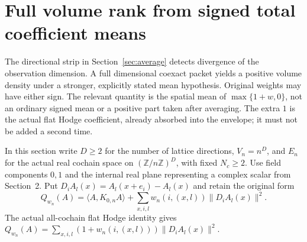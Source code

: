 \section{Full volume rank from signed total coefficient means}\label{sec:volume-mean}
The directional strip in Section~\ref{sec:average} detects divergence of the
observation dimension. A full dimensional coexact packet yields a positive
volume density under a stronger, explicitly stated mean hypothesis. Original
weights may have either sign. The relevant quantity is the spatial mean of
$\max\{1+w,0\}$, not an ordinary signed mean or a positive part taken after
averaging. The extra $1$ is the actual flat Hodge coefficient, already absorbed
into the envelope; it must not be added a second time.

In this section write $D\geq2$ for the number of lattice directions,
$V_n=n^D$, and $E_n$ for the actual real cochain space on
$(\mathbb Z/n\mathbb Z)^D$, with fixed $N_c\geq2$. Use field components
$0,1$ and the internal real plane representing a complex scalar from
Section~2. Put $D_i A_l(x)=A_l(x+e_i)-A_l(x)$ and retain the original form
\[
 Q_{w_n}(A)=\langle A,K_{0,n}A\rangle+
       \sum_{x,i,l}w_n(i,(x,l))\|D_i A_l(x)\|^2.
\]
The actual all-cochain flat Hodge identity gives
$Q_{w_n}(A)=\sum_{x,i,l}(1+w_n(i,(x,l)))\|D_i A_l(x)\|^2$.

